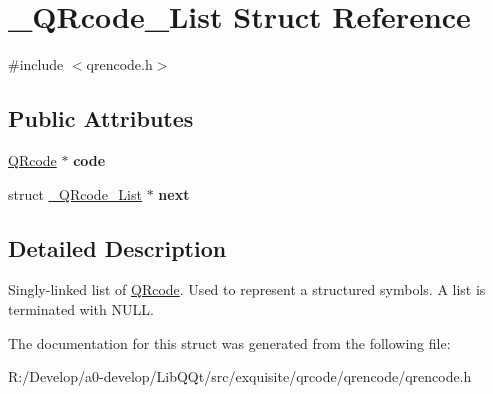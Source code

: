 \hypertarget{struct___q_rcode___list}{}\section{\+\_\+\+Q\+Rcode\+\_\+\+List Struct Reference}
\label{struct___q_rcode___list}


{\ttfamily \#include $<$qrencode.\+h$>$}

\subsection*{Public Attributes}
\begin{DoxyCompactItemize}
\item 
\mbox{\label{struct___q_rcode___list_a3a611fa842869b6e21c1b66d1d61daab}} 
\mbox{\hyperlink{struct_q_rcode}{Q\+Rcode}} $\ast$ {\bfseries code}
\item 
\mbox{\label{struct___q_rcode___list_ab84f6a9ad3836c3dd3309d0752f54160}} 
struct \mbox{\hyperlink{struct___q_rcode___list}{\+\_\+\+Q\+Rcode\+\_\+\+List}} $\ast$ {\bfseries next}
\end{DoxyCompactItemize}


\subsection{Detailed Description}
Singly-\/linked list of \mbox{\hyperlink{struct_q_rcode}{Q\+Rcode}}. Used to represent a structured symbols. A list is terminated with N\+U\+LL. 

The documentation for this struct was generated from the following file\+:\begin{DoxyCompactItemize}
\item 
R\+:/\+Develop/a0-\/develop/\+Lib\+Q\+Qt/src/exquisite/qrcode/qrencode/qrencode.\+h\end{DoxyCompactItemize}
